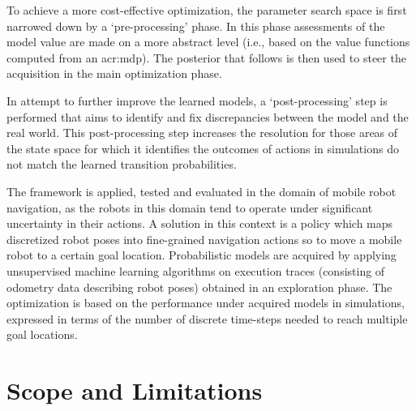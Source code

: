 To achieve a more cost-effective optimization, the parameter search space is first narrowed down by a `pre-processing' phase.
In this phase assessments of the model value are made on a more abstract level (i.e., based on the value functions computed from an \acrshort{acr:mdp}).
The posterior that follows is then used to steer the acquisition in the main optimization phase.

In attempt to further improve the learned models, a `post-processing' step is performed that aims to identify and fix discrepancies between the model and the real world.
This post-processing step increases the resolution for those areas of the state space for which it identifies the outcomes of actions in simulations do not match the learned transition probabilities.

The framework is applied, tested and evaluated in the domain of mobile robot navigation, as the robots in this domain tend to operate under significant uncertainty in their actions.
A solution in this context is a policy which maps discretized robot poses into fine-grained navigation actions so to move a mobile robot to a certain goal location.
Probabilistic models are acquired by applying unsupervised machine learning algorithms on execution traces (consisting of odometry data describing robot poses) obtained in an exploration phase.
The optimization is based on the performance under acquired models in simulations, expressed in terms of the number of discrete time-steps needed to reach multiple goal locations.



\section{Scope and Limitations}
\label{sec:scope-limitations}

